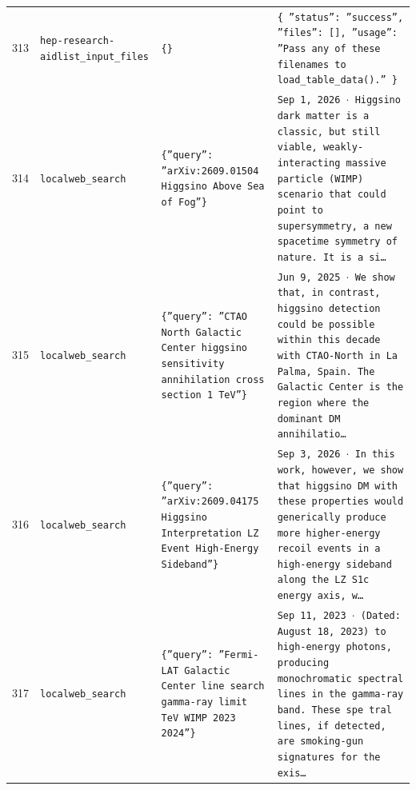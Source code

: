 \documentclass[11pt,a4paper]{article}
\begin{document}
\begin{longtable}{@{}p{}p{}p{}p{}@{}}
313 & \texttt{hep-research-aid}\newline\texttt{list\_\allowbreak{}input\_\allowbreak{}files} & \texttt{\{\}\allowbreak{}} & \texttt{\{   ''status'':\allowbreak{} ''success'',\allowbreak{}   ''files'':\allowbreak{} []\allowbreak{},\allowbreak{}   ''usage'':\allowbreak{} ''Pass any of these filenames to load\_\allowbreak{}table\_\allowbreak{}data()\allowbreak{}.'' \}\allowbreak{}} \\
314 & \texttt{local}\newline\texttt{web\_\allowbreak{}search} & \texttt{\{''query'':\allowbreak{} ''arXiv:\allowbreak{}2609.01504 Higgsino Above Sea of Fog''\}\allowbreak{}} & \texttt{Sep 1,\allowbreak{} 2026 $\cdot$ Higgsino dark matter is a classic,\allowbreak{} but still viable,\allowbreak{} weakly-interacting massive particle (WIMP)\allowbreak{} scenario that could point to supersymmetry,\allowbreak{} a new spacetime symmetry of nature. It is a si\ldots{}\allowbreak{}} \\
315 & \texttt{local}\newline\texttt{web\_\allowbreak{}search} & \texttt{\{''query'':\allowbreak{} ''CTAO North Galactic Center higgsino sensitivity annihilation cross section 1 TeV''\}\allowbreak{}} & \texttt{Jun 9,\allowbreak{} 2025 $\cdot$ We show that,\allowbreak{} in contrast,\allowbreak{} higgsino detection could be possible within this decade with CTAO-North in La Palma,\allowbreak{} Spain. The Galactic Center is the region where the dominant DM annihilatio\ldots{}\allowbreak{}} \\
316 & \texttt{local}\newline\texttt{web\_\allowbreak{}search} & \texttt{\{''query'':\allowbreak{} ''arXiv:\allowbreak{}2609.04175 Higgsino Interpretation LZ Event High-Energy Sideband''\}\allowbreak{}} & \texttt{Sep 3,\allowbreak{} 2026 $\cdot$ In this work,\allowbreak{} however,\allowbreak{} we show that higgsino DM with these properties would generically produce more higher-energy recoil events in a high-energy sideband along the LZ S1c energy axis,\allowbreak{} w\ldots{}\allowbreak{}} \\
317 & \texttt{local}\newline\texttt{web\_\allowbreak{}search} & \texttt{\{''query'':\allowbreak{} ''Fermi-LAT Galactic Center line search gamma-ray limit TeV WIMP 2023 2024''\}\allowbreak{}} & \texttt{Sep 11,\allowbreak{} 2023 $\cdot$ (Dated:\allowbreak{} August 18,\allowbreak{} 2023)\allowbreak{} to high-energy photons,\allowbreak{} producing monochromatic spectral lines in the gamma-ray band. These spe tral lines,\allowbreak{} if detected,\allowbreak{} are smoking-gun signatures for the exis\ldots{}\allowbreak{}} \\

\end{longtable}
\end{document}
